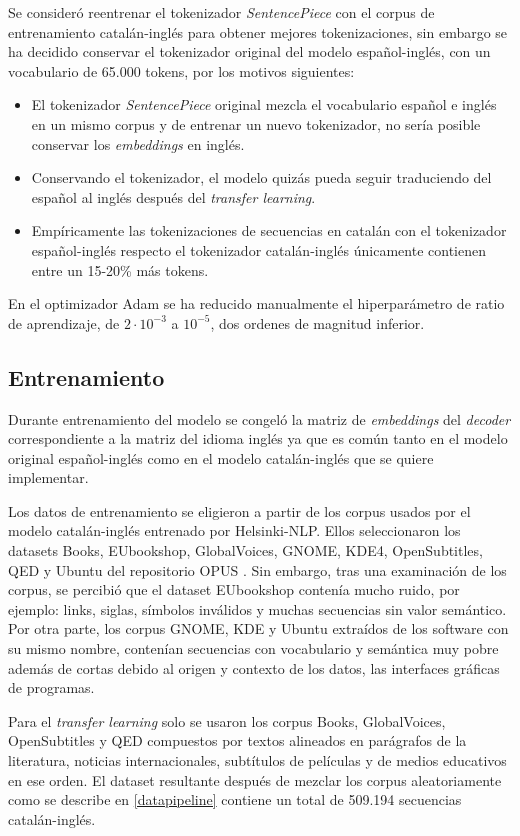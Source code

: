 Se consideró reentrenar el tokenizador \textit{SentencePiece} con el corpus de entrenamiento catalán-inglés para obtener mejores tokenizaciones, sin embargo se ha decidido conservar el tokenizador original del modelo español-inglés, con un vocabulario de 65.000 tokens, por los motivos siguientes:
\begin{itemize}
    \item El tokenizador \textit{SentencePiece} original mezcla el vocabulario español e inglés en un mismo corpus y de entrenar un nuevo tokenizador, no sería posible conservar los \textit{embeddings} en inglés.
    \item Conservando el tokenizador, el modelo quizás pueda seguir traduciendo del español al inglés después del \textit{transfer learning}.
    \item Empíricamente las tokenizaciones de secuencias en catalán con el tokenizador español-inglés respecto el tokenizador catalán-inglés únicamente contienen entre un 15-20\% más tokens.
\end{itemize}

En el optimizador Adam \cite{Kingma2014Dec} se ha reducido manualmente el hiperparámetro de ratio de aprendizaje, de $2\cdot 10^{-3}$ a $10^{-5}$, dos ordenes de magnitud inferior.


\subsection{Entrenamiento}
Durante entrenamiento del modelo se congeló la matriz de \textit{embeddings} del \textit{decoder} correspondiente a la matriz del idioma inglés ya que es común tanto en el modelo original español-inglés como en el modelo catalán-inglés que se quiere implementar.

Los datos de entrenamiento se eligieron a partir de los corpus usados por el modelo catalán-inglés entrenado por Helsinki-NLP. Ellos seleccionaron los datasets Books, EUbookshop, GlobalVoices, GNOME, KDE4, OpenSubtitles, QED y Ubuntu del repositorio OPUS \cite{CORPUS}. Sin embargo, tras una examinación de los corpus, se percibió que el dataset EUbookshop contenía mucho ruido, por ejemplo: links, siglas, símbolos inválidos y muchas secuencias sin valor semántico. Por otra parte, los corpus GNOME, KDE y Ubuntu extraídos de los software con su mismo nombre, contenían secuencias con vocabulario y semántica muy pobre además de cortas debido al origen y contexto de los datos, las interfaces gráficas de programas.

Para el \textit{transfer learning} solo se usaron los corpus Books, GlobalVoices, OpenSubtitles y QED compuestos por textos alineados en parágrafos de la literatura, noticias internacionales, subtítulos de películas y de medios educativos en ese orden.
El dataset resultante después de mezclar los corpus aleatoriamente como se describe en \ref{datapipeline} contiene un total de 509.194 secuencias catalán-inglés.


